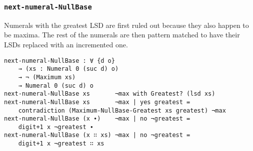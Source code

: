 \documentclass[\main/thesis.tex]{subfiles}
\begin{document}
\begin{center}
    \begin{adjustbox}{max width=\textwidth}
    \end{adjustbox}
\end{center}

\subsubsection{{\lstinline|next-numeral-NullBase|}}

Numerals with the greatest LSD are first ruled out because they also happen
to be maxima. The rest of the numerals are then pattern matched to have their
LSDs replaced with an incremented one.

\begin{lstlisting}
next-numeral-NullBase : ∀ {d o}
    → (xs : Numeral 0 (suc d) o)
    → ¬ (Maximum xs)
    → Numeral 0 (suc d) o
next-numeral-NullBase xs       ¬max with Greatest? (lsd xs)
next-numeral-NullBase xs       ¬max | yes greatest =
    contradiction (Maximum-NullBase-Greatest xs greatest) ¬max
next-numeral-NullBase (x ∙)    ¬max | no ¬greatest =
    digit+1 x ¬greatest ∙
next-numeral-NullBase (x ∷ xs) ¬max | no ¬greatest =
    digit+1 x ¬greatest ∷ xs
\end{lstlisting}
\end{document}
